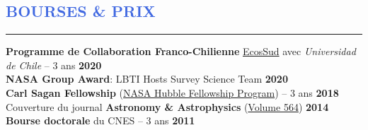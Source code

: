 \documentclass[11pt, a4paper, french]{article}
\begin{document}

\vspace{-0.43cm}
\textcolor{RoyalBlue}{\section{\large BOURSES \& PRIX}
\vspace{-0.2cm}\hrule}
\vspace{0.4cm}

\textbf{Programme de Collaboration Franco-Chilienne} \href{https://www.univ-paris13.fr/ecos-sud/}{EcosSud} avec {\it Universidad de Chile} -- 3 ans \hfill   \textbf{2020}\\ %

\vspace{-0.2cm}
\textbf{NASA Group Award}: LBTI Hosts Survey Science Team \hfill   \textbf{2020}\\ 

\vspace{-0.2cm}
\textbf{Carl Sagan Fellowship} (\href{http://www.stsci.edu/stsci-research/fellowships/nasa-hubble-fellowship-program}{NASA Hubble Fellowship Program}) -- 3 ans \hfill   { \bf 2018}\\

\vspace{-0.2cm}
Couverture du journal \textbf{Astronomy \& Astrophysics} (\href{https://www.aanda.org/articles/aa/abs/2014/04/contents/contents.html}{Volume 564}) \hfill  { \bf 2014}\\


\vspace{-0.2cm}
\textbf{Bourse doctorale} du CNES -- 3 ans \hfill   { \bf 2011}\\


\end{document}
